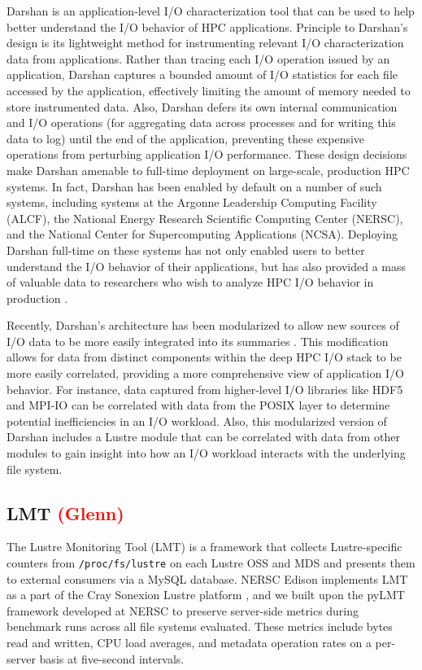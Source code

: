 \documentclass[conference,10pt,compsocconf]{IEEEtran}
\newcommand{\assign}[1]{\textcolor{red}{(#1)}}
\begin{document}
Darshan is an application-level I/O characterization tool that can be used to
help better understand the I/O behavior of HPC applications. Principle to
Darshan's design is its lightweight method for instrumenting relevant I/O
characterization data from applications. Rather than tracing each I/O operation
issued by an application, Darshan captures a bounded amount of I/O statistics
for each file accessed by the application, effectively limiting the amount of
memory needed to store instrumented data. Also, Darshan defers its own internal
communication and I/O operations (for aggregating data across processes and for
writing this data to log) until the end of the application, preventing these
expensive operations from perturbing application I/O performance. These design
decisions make Darshan amenable to full-time deployment on large-scale,
production HPC systems. In fact, Darshan has been enabled by default on a number
of such systems, including systems at the Argonne Leadership Computing Facility
(ALCF), the National Energy Research Scientific Computing Center (NERSC), and
the National Center for Supercomputing Applications (NCSA). Deploying Darshan
full-time on these systems has not only enabled users to better understand the
I/O behavior of their applications, but has also provided a mass of valuable
data to researchers who wish to analyze HPC I/O behavior in production
\cite{carns200924,carns2011understanding,luu2015multiplatform,snyder2015techniques}.

Recently, Darshan's architecture has been modularized to allow new sources
of I/O data to be more easily integrated into its summaries \cite{snyder2016modular}.
This modification allows for data from distinct components within the deep
HPC I/O stack to be more easily correlated, providing a more comprehensive view
of application I/O behavior. For instance, data captured from higher-level I/O
libraries like HDF5 and MPI-IO can be correlated with data from the POSIX layer
to determine potential inefficiencies in an I/O workload. Also, this modularized
version of Darshan includes a Lustre module that can be correlated with data from
other modules to gain insight into how an I/O workload interacts with the
underlying file system.

\subsection{LMT \assign{Glenn}}

The Lustre Monitoring Tool (LMT) is a framework that collects Lustre-specific
counters from \texttt{/proc/fs/lustre} on each Lustre OSS and MDS and presents
them to external consumers via a MySQL database.  NERSC Edison implements LMT
as a part of the Cray Sonexion Lustre platform \cite{Keopp2014}, and we built
upon the pyLMT framework developed at NERSC \cite{Uselton2009} to preserve
server-side metrics during benchmark runs across all file systems evaluated.
These metrics include bytes read and written, CPU load averages, and metadata
operation rates on a per-server basis at five-second intervals.
\end{document}
